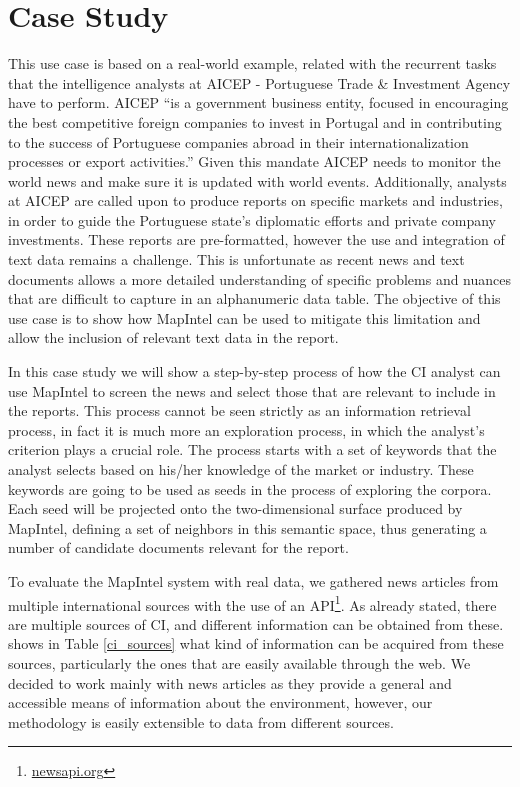 \documentclass[a4paper]{article}
\begin{document}
\section{Case Study}
This use case is based on a real-world example, related with the recurrent tasks that the intelligence analysts at AICEP - Portuguese Trade \& Investment Agency have to perform. AICEP “is a government business entity, focused in encouraging the best competitive foreign companies to invest in Portugal and in contributing to the success of Portuguese companies abroad in their internationalization processes or export activities.” Given this mandate AICEP needs to monitor the world news and make sure it is updated with world events. Additionally, analysts at AICEP are called upon to produce reports on specific markets and industries, in order to guide the Portuguese state's diplomatic efforts and private company investments. These reports are pre-formatted, however the use and integration of text data remains a challenge. This is unfortunate as recent news and text documents allows a more detailed understanding of specific problems and nuances that are difficult to capture in an alphanumeric data table. The objective of this use case is to show how MapIntel can be used to mitigate this limitation and allow the inclusion of relevant text data in the report.

In this case study we will show a step-by-step process of how the CI analyst can use MapIntel to screen the news and select those that are relevant to include in the reports. This process cannot be seen strictly as an information retrieval process, in fact it is much more an exploration process, in which the analyst's criterion plays a crucial role. The process starts with a set of keywords that the analyst selects based on his/her knowledge of the market or industry. These keywords are going to be used as seeds in the process of exploring the corpora. Each seed will be projected onto the two-dimensional surface produced by MapIntel, defining a set of neighbors in this semantic space, thus generating a number of candidate documents relevant for the report.

To evaluate the MapIntel system with real data, we gathered news articles from multiple international sources with the use of an API\footnote{\href{https://newsapi.org/}{newsapi.org}}. As already stated, there are multiple sources of CI, and different information can be obtained from these. \citet{dey2011} shows in Table \ref{ci_sources} what kind of information can be acquired from these sources, particularly the ones that are easily available through the web. We decided to work mainly with news articles as they provide a general and accessible means of information about the environment, however, our methodology is easily extensible to data from different sources. 
\end{document}
